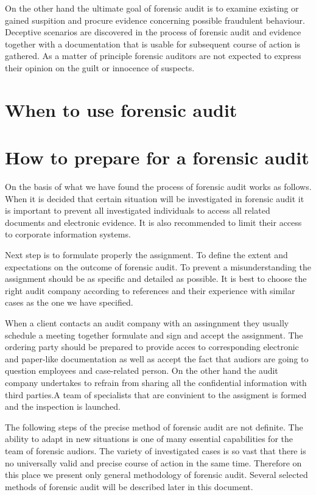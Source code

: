 On the other hand the ultimate goal of forensic audit is to examine existing or gained suspition and procure evidence concerning possible fraudulent behaviour. Deceptive scenarios are discovered in the process of forensic audit and evidence together with a documentation that is usable for subsequent course of action is gathered. As a matter of principle forensic auditors are not expected to express their opinion on the guilt or innocence of suspects.


\section{When to use forensic audit}
\sediva{\blindtext}


\section{How to prepare for a forensic audit}

On the basis of what we have found the process of forensic audit works as follows. When it is decided that certain situation will be investigated in forensic audit it is important to prevent all investigated individuals to access all related documents and electronic evidence. It is also recommended to limit their access to corporate information systems. 

Next step is to formulate properly the assignment. To define the extent and expectations on the outcome of forensic audit. To prevent a misunderstanding the assignment should be as specific and detailed as possible. It is best to choose the right audit company according to references and their experience with similar cases as the one we have specified.

When a client contacts an audit company with an assingnment they usually schedule a meeting together formulate and sign and accept the assignment. The ordering party should be prepared to provide acces to corresponding electronic and paper-like documentation as well as accept the fact that audiors are going to question employees and case-related person. On the other hand the audit company undertakes to refrain from sharing all the confidential information with third parties.A team of specialists that are convinient to the assigment is formed and the inspection is launched. 

The following steps of the precise method of forensic audit are not definite. The ability to adapt in new situations is one of many essential capabilities for the team of forensic audiors. The variety of investigated cases is so vast that there is no universally valid and precise course of action in the same time. Therefore on this place we present only general methodology of forensic audit. Several selected methods of forensic audit will be described later in this document. 

